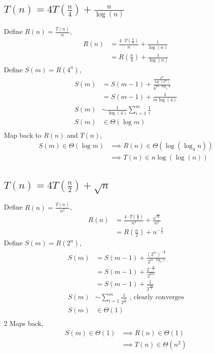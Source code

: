\documentclass[9pt]{extarticle}
\begin{document}
\subsection*{$T(n) = 4T(\frac{n}{4}) + \frac{n}{\log(n)}$}
Define $R(n) = \frac{T(n)}{n}$,
\begin{align*}
    R(n) &= \frac{4\cdot T(\frac{n}{4})}{n} + \frac{1}{\log(n)}\\
    &= R(\frac{n}{4}) + \frac{1}{\log(n)}
\end{align*}
Define $S(m) = R(4^n)$,
\begin{align*}
    S(m) & = S(m - 1) + \frac{\frac{4^m}{\log(4^m)}}{4^{m\cdot \log_4 4}}\\
    &= S(m - 1) + \frac{1}{m \log(4)}\\
    S(m) &\sim \frac{1}{\log(4)}\sum_{i=1}^{m} \frac{1}{i}\\
    S(m) &\in \Theta(\log m)\\
\end{align*}
Map back to $R(n)$ and $T(n)$, 
\begin{align*}
    S(m) \in \Theta(\log m) &\implies R(n) \in \Theta(\log(\log_4 n))\\
    &\implies T(n) \in n\log(\log(n))
\end{align*}


\subsection*{$T(n) = 4T(\frac{n}{2}) + \sqrt{n}$}
Define $R(n) = \frac{T(n)}{n^2}$,
\begin{align*}
    R(n) &= \frac{4\cdot T(\frac{n}{2})}{n^2} + \frac{\sqrt{n}}{n^2}\\
    &= R(\frac{n}{2}) + {n^{-\frac{3}{2}}}
\end{align*}
Define $S(m) = R(2^n)$,
\begin{align*}
    S(m) & = S(m - 1) + \frac{(2^m)^{-\frac{1}{2}}}{2^{m \cdot \log_2 4}}\\
    &= S(m - 1) + \frac{2^{-\frac{m}{2}}}{2^{2m}}\\
    &= S(m - 1) + \frac{1}{2^{\frac{3m}{2}}}\\
    S(m) &\sim \sum_{i=1}^{m} \frac{1}{2^{\frac{3i}{2}}} \text{ , clearly converges}\\
    S(m) &\in \Theta(1)\\
\end{align*}2
Maps back, 
\begin{align*}
    S(m) \in \Theta(1) &\implies R(n) \in \Theta(1)\\
    &\implies T(n) \in \Theta(n^2)
\end{align*}
\end{document}
